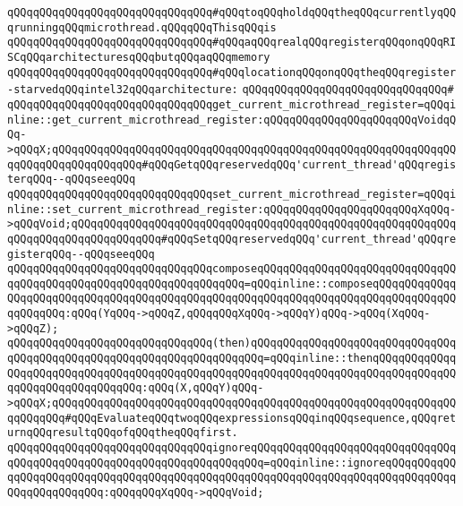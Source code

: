\verb|qQQqqQQqqQQqqQQqqQQqqQQqqQQqqQQq#qQQqtoqQQqholdqQQqtheqQQqcurrentlyqQQqrunningqQQqmicrothread.qQQqqQQqThisqQQqis|\newline
\verb|qQQqqQQqqQQqqQQqqQQqqQQqqQQqqQQq#qQQqaqQQqrealqQQqregisterqQQqonqQQqRISCqQQqarchitecturesqQQqbutqQQqaqQQqmemory|\newline
\verb|qQQqqQQqqQQqqQQqqQQqqQQqqQQqqQQq#qQQqlocationqQQqonqQQqtheqQQqregister-starvedqQQqintel32qQQqarchitecture:|\newline
\verb|qQQqqQQqqQQqqQQqqQQqqQQqqQQqqQQq#|\newline
\verb|qQQqqQQqqQQqqQQqqQQqqQQqqQQqqQQqget_current_microthread_register=qQQqinline::get_current_microthread_register:qQQqqQQqqQQqqQQqqQQqqQQqVoidqQQq->qQQqX;qQQqqQQqqQQqqQQqqQQqqQQqqQQqqQQqqQQqqQQqqQQqqQQqqQQqqQQqqQQqqQQqqQQqqQQqqQQqqQQqqQQq#qQQqGetqQQqreservedqQQq'current_thread'qQQqregisterqQQq--qQQqseeqQQq|\newline
\verb|qQQqqQQqqQQqqQQqqQQqqQQqqQQqqQQqset_current_microthread_register=qQQqinline::set_current_microthread_register:qQQqqQQqqQQqqQQqqQQqqQQqXqQQq->qQQqVoid;qQQqqQQqqQQqqQQqqQQqqQQqqQQqqQQqqQQqqQQqqQQqqQQqqQQqqQQqqQQqqQQqqQQqqQQqqQQqqQQqqQQq#qQQqSetqQQqreservedqQQq'current_thread'qQQqregisterqQQq--qQQqseeqQQq|\newline
\newline
\verb|qQQqqQQqqQQqqQQqqQQqqQQqqQQqqQQqcomposeqQQqqQQqqQQqqQQqqQQqqQQqqQQqqQQqqQQqqQQqqQQqqQQqqQQqqQQqqQQqqQQqqQQq=qQQqinline::composeqQQqqQQqqQQqqQQqqQQqqQQqqQQqqQQqqQQqqQQqqQQqqQQqqQQqqQQqqQQqqQQqqQQqqQQqqQQqqQQqqQQqqQQqqQQq:qQQq(YqQQq->qQQqZ,qQQqqQQqXqQQq->qQQqY)qQQq->qQQq(XqQQq->qQQqZ);|\newline
\verb|qQQqqQQqqQQqqQQqqQQqqQQqqQQqqQQq(then)qQQqqQQqqQQqqQQqqQQqqQQqqQQqqQQqqQQqqQQqqQQqqQQqqQQqqQQqqQQqqQQqqQQqqQQq=qQQqinline::thenqQQqqQQqqQQqqQQqqQQqqQQqqQQqqQQqqQQqqQQqqQQqqQQqqQQqqQQqqQQqqQQqqQQqqQQqqQQqqQQqqQQqqQQqqQQqqQQqqQQqqQQq:qQQq(X,qQQqY)qQQq->qQQqX;qQQqqQQqqQQqqQQqqQQqqQQqqQQqqQQqqQQqqQQqqQQqqQQqqQQqqQQqqQQqqQQqqQQqqQQq#qQQqEvaluateqQQqtwoqQQqexpressionsqQQqinqQQqsequence,qQQqreturnqQQqresultqQQqofqQQqtheqQQqfirst.|\newline
\newline
\verb|qQQqqQQqqQQqqQQqqQQqqQQqqQQqqQQqignoreqQQqqQQqqQQqqQQqqQQqqQQqqQQqqQQqqQQqqQQqqQQqqQQqqQQqqQQqqQQqqQQqqQQqqQQq=qQQqinline::ignoreqQQqqQQqqQQqqQQqqQQqqQQqqQQqqQQqqQQqqQQqqQQqqQQqqQQqqQQqqQQqqQQqqQQqqQQqqQQqqQQqqQQqqQQqqQQqqQQq:qQQqqQQqXqQQq->qQQqVoid;|\newline
